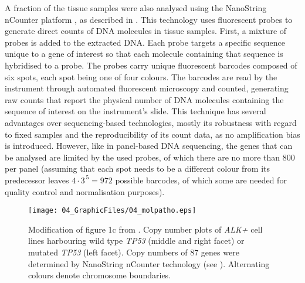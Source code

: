 A fraction\label{mar:nanostring} of the tissue samples
were also analysed using the NanoString nCounter platform \citep{%
Geiss2008,Tsang2017}, as described in \citet{Kim2016}. This technology uses
fluorescent probes to generate direct counts of DNA molecules in tissue
samples. First, a mixture of probes is added to the extracted DNA. Each probe
targets a specific sequence unique to a gene of interest so that each molecule
containing that sequence is hybridised to a probe. The probes carry unique
fluorescent barcodes composed of six spots, each spot being one of four
colours. The barcodes are read by the instrument through automated fluorescent
microscopy and counted, generating raw counts that report the physical number
of DNA molecules containing the sequence of interest on the instrument's
slide. This technique has several advantages over sequencing-based
technologies, mostly its robustness with regard to fixed samples and the
reproducibility of its count data, as no amplification bias is introduced.
However, like in panel-based DNA sequencing, the genes that can be analysed
are limited by the used probes, of which there are no more than \num{800} per
panel (assuming that each spot needs to be a different colour from its
predecessor leaves $4\cdot3^{\,5}\!=972$ possible barcodes, of which some are
needed for quality control and normalisation purposes).

\begin{figure}[b!]
\centering
\texttt{[image: 04\_GraphicFiles/04\_molpatho.eps]}
\caption{Modification of figure 1c from \citet{Alidousty2018}. Copy number
  plots of \textit{ALK+} cell lines harbouring wild type \textit{TP53} (middle
  and right facet) or mutated \textit{TP53} (left facet). Copy numbers of
  \num{87} genes were determined by NanoString nCounter technology (see
  ). Alternating colours denote chromosome boundaries.}
\label{fig:molpatho}
\end{figure}

